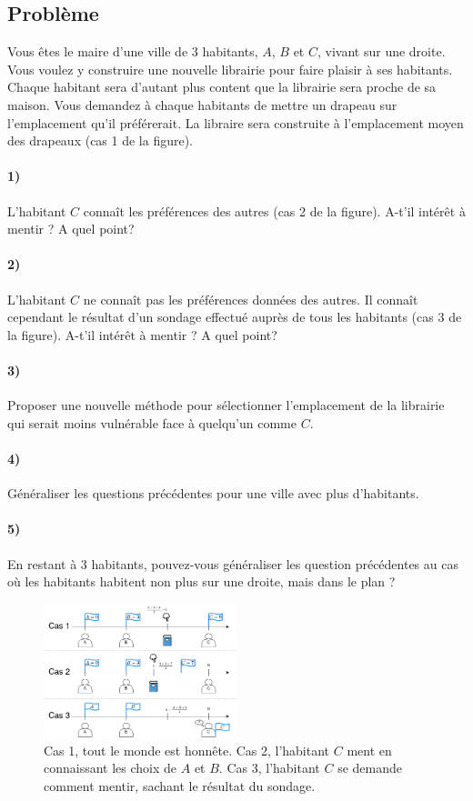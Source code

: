\documentclass[a4paper,10pt,oneside]{article}
\begin{document}
\subsection{Problème}

Vous êtes le maire d'une ville de 3 habitants, $A$, $B$ et $C$,  vivant sur une droite.
Vous voulez y construire une nouvelle librairie pour faire plaisir à ses habitants.
Chaque habitant sera d'autant plus content que la librairie sera proche de sa maison. 
Vous demandez à chaque habitants de mettre un drapeau sur l'emplacement qu'il préférerait.
La libraire sera construite à l'emplacement moyen des drapeaux (cas 1 de la figure).

\paragraph*{1)} 
L'habitant $C$ connaît les préférences des autres (cas 2 de la figure).
A-t'il intérêt à mentir ? A quel point?

\paragraph*{2)} 
L'habitant $C$ ne connaît pas les préférences données des autres.
Il connaît cependant le résultat d'un sondage effectué auprès de tous les habitants (cas 3 de la figure).
A-t'il intérêt à mentir ? A quel point?

\paragraph*{3)} 
Proposer une nouvelle méthode pour sélectionner l'emplacement de la librairie qui serait moins vulnérable face à quelqu'un comme $C$.

\paragraph*{4)} Généraliser les questions précédentes pour une ville avec plus d'habitants.

\paragraph*{5)} En restant à 3 habitants, pouvez-vous généraliser les question précédentes au cas où les habitants habitent non plus sur une droite, mais dans le plan ? 


\begin{figure}[!h]
  \centering
  \includegraphics[width=0.50\textwidth]{figures/library.png}
  \caption{
    Cas 1, tout le monde est honnête. 
    Cas 2, l'habitant $C$ ment en connaissant les choix de $A$ et $B$. 
    Cas 3, l'habitant $C$ se demande comment mentir, sachant le résultat du sondage.}
\end{figure}
\end{document}
